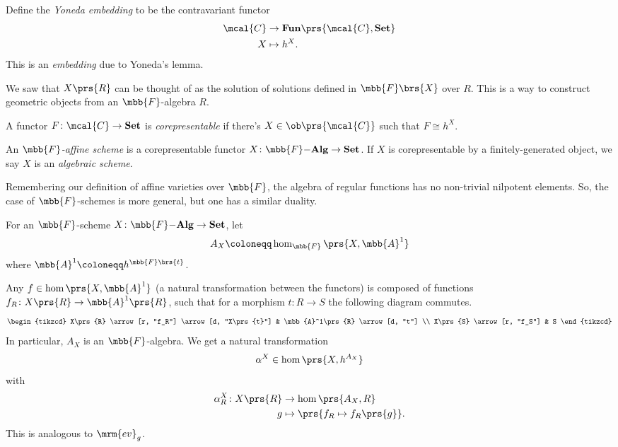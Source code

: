 \documentclass[10pt,a4paper,twoside,openany,hidelinks]{book}
\begin{document}

\begin{definition}
Define the \emph{Yoneda embedding} to be the contravariant functor
\begin{align*}
\mcal{C} &\to \mathbf{Fun}\prs{\mcal{C},\mathbf{Set}} \\
X &\mapsto h^X \text{.}
\end{align*}
This is an \emph{embedding} due to Yoneda's lemma.
\end{definition}

\begin{remark}
We saw that $X\prs{R}$ can be thought of as the solution of solutions defined in $\mbb{F}\brs{X}$ over $R$. This is a way to construct geometric objects from an $\mbb{F}$-algebra $R$.
\end{remark}

\begin{definition}
A functor $F \colon \mcal{C} \to \mathbf{Set}$ is \emph{corepresentable} if there's $X \in \ob\prs{\mcal{C}}$ such that $F \cong h^X$.
\end{definition}

\newcommand{\mbf}[1]{\mathbf{#1}}

\begin{definition}
An \emph{$\mbb{F}$-affine scheme} is a corepresentable functor $X \colon \mbb{F}\mbf{-Alg} \to \mbf{Set}$.
If $X$ is corepresentable by a finitely-generated object, we say $X$ is an \emph{algebraic scheme}.
\end{definition}

\begin{remark}
Remembering our definition of affine varieties over $\mbb{F}$, the algebra of regular  functions has no non-trivial nilpotent elements. So, the case of $\mbb{F}$-schemes is more general, but one has a similar duality.
\end{remark}

\begin{definition}
For an $\mbb{F}$-scheme $X \colon \mbb{F}\mbf{-Alg} \to \mbf{Set}$, let
\[A_X \coloneqq \hom_{\mbb{F}}\prs{X, \mbb{A}^1}\]
where $\mbb{A}^1 \coloneqq h^{\mbb{F}\brs{t}}$.
\end{definition}

Any $f \in \hom\prs{X,\mbb{A}^1}$ (a natural transformation between the functors) is composed of functions $f_R \colon X\prs{R} \to \mbb{A}^1\prs{R}$, such that for a morphism $t \colon R \to S$ the following diagram commutes.
\[
\begin{tikzcd}
X\prs{R} \arrow[r, "f_R"] \arrow[d, "X\prs{t}"] & \mbb{A}^1\prs{R} \arrow[d, "t"] \\
X\prs{S} \arrow[r, "f_S"] & S
\end{tikzcd}
\]
In particular, $A_X$ is an $\mbb{F}$-algebra. We get a natural transformation
\[\alpha^X \in \hom\prs{X, h^{A_X}}\]
with
\begin{align*}
\alpha^X_R \colon X\prs{R} &\to \hom\prs{A_X, R} \\
g &\mapsto \prs{f_R \mapsto f_R\prs{g}} \text{.}
\end{align*}
This is analogous to $\mrm{ev}_g$.
\end{document}
